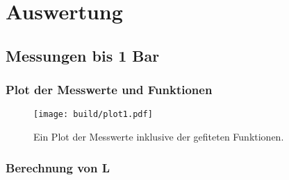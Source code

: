 \section{Auswertung}

\subsection{Messungen bis 1 Bar}

\subsubsection{Plot der Messwerte und Funktionen}
\begin{figure}[htp]
    \centering
    \texttt{[image: build/plot1.pdf]}
    \caption{Ein Plot der Messwerte inklusive der gefiteten Funktionen.}
    \label{img:plot1}
\end{figure}
\FloatBarrier

\subsubsection{Berechnung von L}

